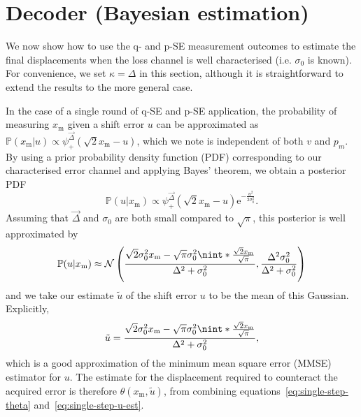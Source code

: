 \documentclass[prx,reprint,superscriptaddress,longbibliography,floatfix,nofootinbib]{revtex4-1}
\DeclarePairedDelimiter{\nint}\lfloor\rceil
\begin{document}
\section{Decoder (Bayesian estimation)}
\label{section-decoder}
We now show how to use the q- and p-SE measurement outcomes to estimate the final displacements when the loss channel is well characterised (i.e. $\sigma_0$ is known).
For convenience, we set $\kappa = \Delta$ in this section, although it is straightforward to extend the results to the more general case.


In the case of a single round of q-SE and p-SE application, the probability of measuring $x_\text{m}$ given a shift error $u$ can be approximated as $\mathbb{P}(x_\text{m}|u) \propto \psi^{\vec{\Delta}}_{+}(\sqrt{2}x_\text{m} - u)$, which we note is independent of both $v$ and $p_m$.
By using a prior probability density function (PDF) corresponding to our characterised error channel and applying Bayes' theorem, we obtain a posterior PDF
%
\begin{equation}
\mathbb{P}(u|x_\text{m}) \propto \psi^{\vec{\Delta}}_{+}(\sqrt{2}x_\text{m} - u)\text{e}^{-\frac{u^2}{2\sigma_0^2}}.
\end{equation}
%
Assuming that $\vec{\Delta}$ and $\sigma_0$ are both small compared to $\sqrt{\pi}$, this posterior is well approximated by
\begin{equation}
    \mathbb{P}(u|x_\text{m}) \approx \mathcal{N}\left(\frac{\sqrt{2} \sigma_0^2 x_\text{m} - \sqrt{\pi} \sigma_0^2  \nint*{\frac{\sqrt{2}x_\text{m}}{\sqrt{\pi}}}}{\Delta^2 + \sigma_0^2}, \frac{\Delta^2\sigma_0^2}{\Delta^2 + \sigma_0^2}\right) 
\end{equation}
%
and we take our estimate $\tilde{u}$ of the shift error $u$ to be the mean of this Gaussian.
Explicitly,
%
\begin{equation}
    \tilde{u} = \frac{\sqrt{2} \sigma_0^2 x_\text{m} - \sqrt{\pi} \sigma_0^2  \nint*{\frac{\sqrt{2}x_\text{m}}{\sqrt{\pi}}}}{\Delta^2 + \sigma_0^2},
    \label{eq:single-step-u-est}
\end{equation}
%
which is a good approximation of the minimum mean square error (MMSE) estimator for $u$.
The estimate for the displacement required to counteract the acquired error is therefore $\theta(x_\text{m},\tilde{u})$, from combining equations\ \eqref{eq:single-step-theta} and~\eqref{eq:single-step-u-est}.
\end{document}
